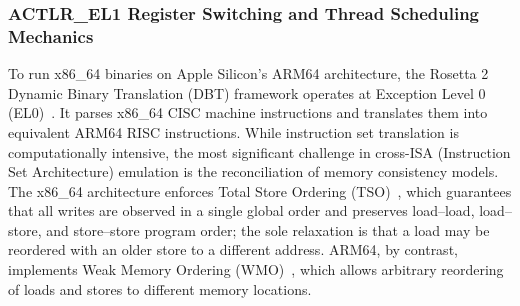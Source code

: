 \subsubsection{ACTLR\_EL1 Register Switching and Thread Scheduling Mechanics}
To run x86\_64 binaries on Apple Silicon's ARM64 architecture, the Rosetta 2 Dynamic Binary Translation (DBT) framework operates at Exception Level 0 (EL0)~\cite{apple2020rosetta, altinay2020survey}. It parses x86\_64 CISC machine instructions and translates them into equivalent ARM64 RISC instructions. While instruction set translation is computationally intensive, the most significant challenge in cross-ISA (Instruction Set Architecture) emulation is the reconciliation of memory consistency models. The x86\_64 architecture enforces Total Store Ordering (TSO)~\cite{Reimers2026Arancini, Gao2024CrossMapping}, which guarantees that all writes are observed in a single global order and preserves load--load, load--store, and store--store program order; the sole relaxation is that a load may be reordered with an older store to a different address. ARM64, by contrast, implements Weak Memory Ordering (WMO)~\cite{Gouicem2023Risotto, Wrenger2024AppleM1}, which allows arbitrary reordering of loads and stores to different memory locations.

